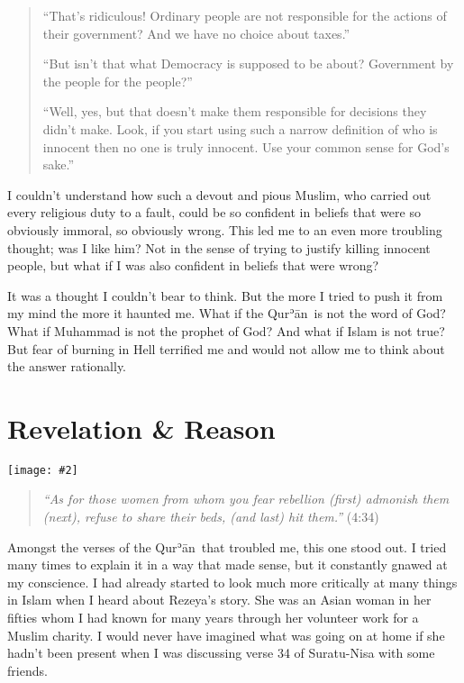 \documentclass[12pt]{memoir}
\def\´{ʾ} %
\def \Quran{Qur\-\´ān} %
\def\–{-\hskip0pt}
\newcommand{\QRef}[1]{{\color{darkblue}#1}}
\newcommand{\img}[3]{\begin{center}%
\texttt{[image: \#2]}\\{\small\em#3}%
\end{center}}
\begin{document}
\begin{quote}
“That’s ridiculous! Ordinary people are not responsible
for the actions of their government?
And we have no choice about taxes.”

“But isn’t that what Democracy is supposed to be about?
Government by the people for the people?”

“Well, yes, but that doesn’t make them responsible
for decisions they didn’t make.
Look, if you start using such a narrow definition
of who is innocent then no one is truly innocent.
Use your common sense for God’s sake.”
\end{quote}

I couldn’t understand how such a devout and pious Muslim,
who carried out every religious duty to a fault,
could be so confident in beliefs that were so obviously immoral,
so obviously wrong.
This led me to an even more troubling thought; was I like him?
Not in the sense of trying to justify killing innocent people,
but what if I was also confident in beliefs that were wrong?

It was a thought I couldn’t bear to think.
But the more I tried to push it from my mind the more it haunted me.
What if the \Quran\ is not the word of God?
What if Muhammad is not the prophet of God?
And what if Islam is not true?
But fear of burning in Hell terrified me
and would not allow me to think about the answer rationally.


\chapter{Revelation \& Reason}

\img{scale=0.6}{Man_Reading_Koran.jpg}{}

\begin{quote}
\emph{“As for those women from whom you fear rebellion (first)
admonish them (next), refuse to share their beds, (and last) hit them.”}
(\QRef{4:34})
\end{quote}

Amongst the verses of the \Quran\ that troubled me, this one stood out.
I tried many times to explain it in a way that made sense,
but it constantly gnawed at my conscience.
I had already started to look much more critically
at many things in Islam when I heard about Rezeya’s story.
She was an Asian woman in her fifties whom I had known
for many years through her volunteer work for a Muslim charity.
I would never have imagined what was going on at home
if she hadn’t been present when I was discussing
verse 34 of Suratu\–Nisa with some friends.
\end{document}
